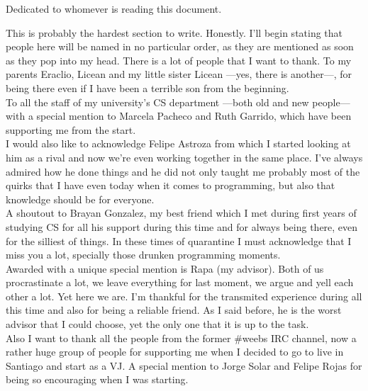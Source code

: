 
\begin{dedicatory}
    Dedicated to whomever is reading this document.
\end{dedicatory}

\begin{acknowledgment}
This is probably the hardest section to write. Honestly. I'll begin stating that people here will be named in no particular order, as they are mentioned as soon as they pop into my head. There is a lot of people that I want to thank. To my parents Eraclio, Licean and my little sister Licean ---yes, there is another---, for being there even if I have been a terrible son from the beginning. \\

To all the staff of my university's  CS department ---both old and new people--- with a special mention to Marcela Pacheco and Ruth Garrido, which have been supporting me from the start. \\

I would also like to acknowledge Felipe Astroza from which I started looking at him as a rival and now we're even working together in the same place. I've always admired how he done things and he did not only taught me probably most of the quirks that I have even today when it comes to programming, but also that knowledge should be for everyone.\\

A shoutout to Brayan Gonzalez, my best friend which I met during first years of studying CS for all his support during this time and for always being there, even for the silliest of things. In these times of quarantine I must acknowledge that I miss you a lot, specially those drunken programming moments.\\

Awarded with a unique special mention is Rapa (my advisor). Both of us procrastinate a lot, we leave everything for last moment, we argue and yell each other a lot. Yet here we are. I'm thankful for the transmited experience during all this time and also for being a reliable friend. As I said before, he is the worst advisor that I could choose, yet the only one that it is up to the task.\\

Also I want to thank all the people from the former \#weebs IRC channel, now a rather huge group of people for supporting me when I decided to go to live in Santiago and start as a VJ. A special mention to Jorge Solar and Felipe Rojas for being so encouraging when I was starting.\\


\end{acknowledgment}
